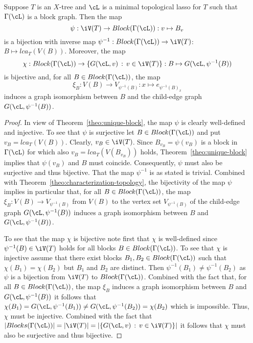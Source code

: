 \begin{cor}\label{cor:bijection}
  Suppose $T$ is an $X$-tree and $\cL$ is a minimal topological lasso for $T$
  such that $\Gamma(\cL)$ is a block graph. Then the map
$$
\psi:\iV(T)\to Block(\Gamma(\cL)) : v\mapsto B_v
$$
is a bijection with inverse map $\psi^{-1}:Block(\Gamma(\cL))\to \iV(T)$:
$B\mapsto lca_T(V(B))$. Moreover, the map
$$
\chi:Block(\Gamma(\cL)) \to \{G(\cL, v)\,:\, v\in \iV(T)\}
: B\mapsto G(\cL,\psi^{-1}(B))
$$
is bijective and,
 for all $B\in Block(\Gamma(\cL))$, the map
$$
\xi_B:V(B) \to V_{\psi^{-1}(B)} 
: x\mapsto e_{\psi^{-1}(B)_x}
$$ 
induces a graph isomorphism between $B$ and the child-edge graph $G(\cL,
\psi^{-1}(B))$.
\end{cor}
\begin{proof}
  In view of Theorem~\ref{theo:unique-block}, the map $\psi$ is clearly
  well-defined and injective. To see that $\psi$ is surjective let $B\in
  Block(\Gamma(\cL))$ and put $v_B=lca_T(V(B))$. Clearly, $v_B\in
  \iV(T)$. Since $B_{v_B}=\psi(v_B)$ is a block in $\Gamma(\cL)$ for which
  also $v_B=lca_T(V(B_{v_B}))$ holds, Theorem~\ref{theo:unique-block} implies
  that $\psi(v_B)$ and $B$ must coincide.  Consequently, $\psi$ must also be
  surjective and thus bijective. That the map $\psi^{-1}$ is as stated is
  trivial.  Combined with Theorem~\ref{theo:characterization-topology}, the
  bijectivity of the map $\psi$ implies in particular that, for all $B\in
  Block(\Gamma(\cL))$, the map $\xi_B: V(B) \to V_{\psi^{-1}(B)} $ from $V(B)$
  to the vertex set $V_{\psi^{-1}(B)} $ of the child-edge graph $G(\cL,
  \psi^{-1}(B))$ induces a graph isomorphism between $B$ and $G(\cL,
  \psi^{-1}(B))$.

  To see that the map $\chi$ is bijective note first that $\chi$ is
  well-defined since $\psi^{-1}(B)\in \iV(T)$ holds for all blocks $B\in
  Block(\Gamma(\cL))$. To see that $\chi$ is injective assume that there exist
  blocks $B_1,B_2\in Block(\Gamma(\cL))$ such that $\chi(B_1)=\chi(B_2)$ but
  $B_1$ and $B_2$ are distinct.  Then $\psi^{-1}(B_1)\not= \psi^{-1}(B_2)$ as
  $\psi$ is a bijection from $\iV(T)$ to $Block(\Gamma(\cL)) $.  Combined with
  the fact that, for all $B\in Block(\Gamma(\cL))$, the map $\xi_B$ induces a
  graph isomorphism between $B$ and $G(\cL, \psi^{-1}(B))$ it follows that
  $\chi(B_1)=G(\cL,\psi^{-1}(B_1))\not=G(\cL,\psi^{-1}(B_2))=\chi(B_2)$ which
  is impossible. Thus, $\chi$ must be injective. Combined with the fact that
  $|Blocks(\Gamma(\cL))|=|\iV(T)|=|\{G(\cL, v)\,:\, v\in \iV(T)\}|$ it follows
  that $\chi$ must also be surjective and thus bijective.
\end{proof}

